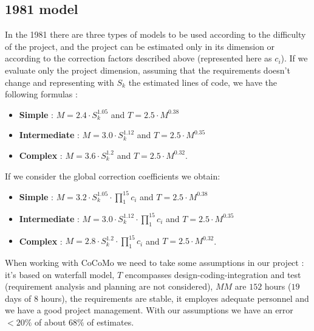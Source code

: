 \documentclass[11pt]{article}
\begin{document}
\subsection{1981 model}
In the 1981 there are three types of models to be used according to the difficulty of the project, and the project can be estimated only in its dimension or according to the correction factors described above (represented here as $c_i$). If we evaluate only the project dimension, assuming that the requirements doesn't change and representing with $S_k$ the estimated lines of code, we have the following formulas :
\begin{itemize}
\item \textbf{Simple} : $M = 2.4 \cdot S_k^{1.05}$ and $T = 2.5 \cdot M^{0.38}$
\item \textbf{Intermediate} : $M = 3.0 \cdot S_k^{1.12}$ and $T = 2.5 \cdot M^{0.35}$
\item \textbf{Complex} : $M = 3.6 \cdot S_k^{1.2}$ and $T = 2.5 \cdot M^{0.32}$.
\end{itemize}
If we consider the global correction coefficients we obtain:
\begin{itemize}
\item \textbf{Simple} : $M = 3.2 \cdot S_k^{1.05} \cdot \prod_{1}^{15} c_i$ and $T = 2.5 \cdot M^{0.38}$
\item \textbf{Intermediate} : $M = 3.0 \cdot S_k^{1.12} \cdot \prod_{1}^{15} c_i$ and $T = 2.5 \cdot M^{0.35}$
\item \textbf{Complex} : $M = 2.8 \cdot S_k^{1.2} \cdot \prod_{1}^{15} c_i$ and $T = 2.5 \cdot M ^{0.32}$.
\end{itemize}
When working with CoCoMo we need to take some assumptions in our project : it's based on waterfall model, $T$ encompasses design-coding-integration and test (requirement analysis and planning are not considered), $MM$ are $152$ hours ($19$ days of $8$ hours), the requirements are stable, it employes adequate personnel and we have a good project management. With our assumptions we have an error $< 20\%$ of about $68\%$ of estimates. 
\end{document}
